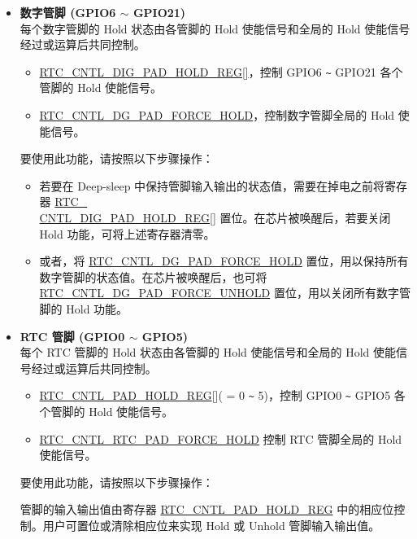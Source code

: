 \documentclass[main\_\_CN.tex]{subfiles}
\begin{document}
\begin{itemize}
\item \textbf{数字管脚 (GPIO6 $\sim$ GPIO21)}\\
每个数字管脚的 Hold 状态由各管脚的 Hold 使能信号和全局的 Hold 使能信号经过或运算后共同控制。
\begin{itemize}
    \item \hyperref[regdesc:RTCCNTLDIGPADHOLDREG] {RTC\_CNTL\_DIG\_PAD\_HOLD\_REG[]}，控制 GPIO6 \verb+~+ GPIO21 各个管脚的 Hold 使能信号。
    \item \hyperref[fielddesc:RTCCNTLDGPADFORCEHOLD]{RTC\_CNTL\_DG\_PAD\_FORCE\_HOLD}，控制数字管脚全局的 Hold 使能信号。
\end{itemize}
要使用此功能，请按照以下步骤操作：

\begin{itemize}
    \item 若要在 Deep-sleep 中保持管脚输入输出的状态值，需要在掉电之前将寄存器 \hyperref[regdesc:RTCCNTLDIGPADHOLDREG]{RTC\_\\CNTL\_DIG\_PAD\_HOLD\_REG[]} 置位。在芯片被唤醒后，若要关闭 Hold 功能，可将上述寄存器清零。
    \item 或者，将 \hyperref[fielddesc:RTCCNTLDGPADFORCEHOLD]{RTC\_CNTL\_DG\_PAD\_FORCE\_HOLD} 置位，用以保持所有数字管脚的状态值。在芯片被唤醒后，也可将 \hyperref[fielddesc:RTCCNTLDGPADFORCEUNHOLD]{RTC\_CNTL\_DG\_PAD\_FORCE\_UNHOLD} 置位，用以关闭所有数字管脚的 Hold 功能。
\end{itemize}


\item \textbf{RTC 管脚 (GPIO0 $\sim$ GPIO5)}\\
每个 RTC 管脚的 Hold 状态由各管脚的 Hold 使能信号和全局的 Hold 使能信号经过或运算后共同控制。
\begin{itemize}
    \item \hyperref[regdesc:RTCCNTLPADHOLDREG]{RTC\_CNTL\_PAD\_HOLD\_REG}[]( = 0 \verb+~+ 5)，控制 GPIO0 \verb+~+ GPIO5 各个管脚的 Hold 使能信号。
    \item \hyperref[fielddesc:RTCCNTLRTCPADFORCEHOLD]{RTC\_CNTL\_RTC\_PAD\_FORCE\_HOLD} 控制 RTC 管脚全局的 Hold 使能信号。
\end{itemize}

要使用此功能，请按照以下步骤操作：

管脚的输入输出值由寄存器 \hyperref[regdesc:RTCCNTLPADHOLDREG]{RTC\_CNTL\_PAD\_HOLD\_REG} 中的相应位控制。用户可置位或清除相应位来实现 Hold 或 Unhold 管脚输入输出值。
\end{itemize}
\end{document}
